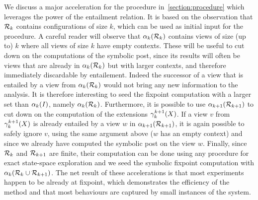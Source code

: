 We discuss a major acceleration for the procedure
in~\ref{section:procedure} which leverages the power of the entailment
relation. %
It is based on the observation that $\mathcal{R}_{k}$ contains
configurations of size $k$, which can be used as initial input
for the procedure.
%
A careful reader will observe that $\alpha_{k}(\mathcal{R}_{k})$ contains
views of size (up to) $k$ where all views of size $k$ have empty
contexts. These will be useful to cut down on the computations of the
symbolic post, %
since its results will often be views that are already in $\alpha_{k}(\mathcal{R}_{k})$ but with larger contexts, and therefore immediately
discardable by entailement.
%
Indeed the successor of a view that is entailed by a view from
$\alpha_{k}(\mathcal{R}_{k})$ would not bring any new information to
the analysis. %
%
It is therefore interesting to seed the fixpoint computation with a
larger set than $\alpha_{k}(\mathit{I})$, namely $\alpha_{k}(\mathcal{R}_{k})$.
%
Furthermore, it is possible to use $\alpha_{k+1}(\mathcal{R}_{k+1})$ %
to cut down on the computation of the extensions
$\gamma_{k}^{k+1}(X)$. %
%
If a view $v$ from $\gamma_{k}^{k+1}(X)$ is already entailed
by a view $w$ in $\alpha_{k+1}(\mathcal{R}_{k+1})$, %
it is again possible to safely ignore $v$, using the same argument
above ($w$ has an empty context) and since we already have computed
the symbolic post on the view $w$.
Finally, since $\mathcal{R}_{k}$ and $\mathcal{R}_{k+1}$ are finite, their
computation can be done using any procedure for exact state-space
exploration and we seed the symbolic fixpoint computation with
$\alpha_{k}(\mathcal{R}_{k} \cup \mathcal{R}_{k+1})$. %
%
The net result of these accelerations is that most experiments happen
to be already at fixpoint, which demonstrates the efficiency of the
method and that most behaviours are captured by small instances of the
system.

